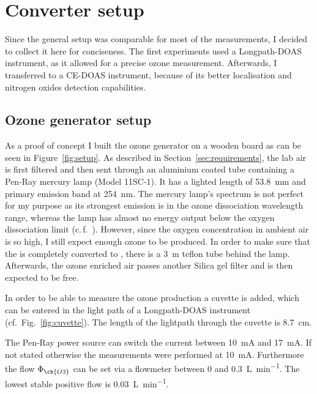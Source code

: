 \section{Converter setup}
\label{sec:setup}

Since the general setup was comparable for most
of the measurements, I decided to collect it here for
conciseness. The first experiments used a Longpath-DOAS instrument, as
it allowed for a precise ozone measurement. Afterwards, I transferred
to a CE-DOAS instrument, because of its better localisation and
nitrogen oxides detection capabilities.

\subsection{Ozone generator setup}
\label{sec:ozone-setup}

As a proof of concept I built the ozone generator on a wooden board as
can be seen in Figure~\ref{fig:setup}. As described in
Section~\ref{sec:requirements}, the lab air is first filtered and then
sent through an aluminium coated tube containing a Pen-Ray mercury
lamp (Model 11SC-1). It has a lighted length of
\SI{53.8}{\milli\meter} and primary emission band at
\SI{254}{\nano\meter}. The mercury lamp's spectrum is not perfect for
my purpose as its strongest emission is in the ozone dissociation
wavelength range, whereas the lamp has almost no energy output below
the oxygen dissociation limit (c.\,f.~\cite{lamp}). However, since the
oxygen concentration in ambient air is so high, I still expect enough
ozone to be produced. In order to make sure that the  is
completely converted to , there is a \SI{3}{\meter} teflon
tube behind the lamp. Afterwards, the ozone enriched air passes another
Silica gel filter and is then expected to be  free.

In order to be able to measure the ozone production a cuvette is
added, which can be entered in the light path of a Longpath-DOAS
instrument (cf.\ Fig.~\ref{fig:cuvette}). The length of the lightpath
through the cuvette is \SI{8.7}{\centi\meter}.

The Pen-Ray power source can switch the current between
\SI{10}{\milli\ampere} and \SI{17}{\milli\ampere}. If not stated
otherwise the measurements were performed at \SI{10}{\milli\ampere}.
Furthermore the flow $\Phi_{\ch{O 3}}$ can be set via a flowmeter
between \num{0} and \SI{0.3}{\liter\per\minute}. The lowest stable
positive flow is \SI{0.03}{\liter\per\minute}.

